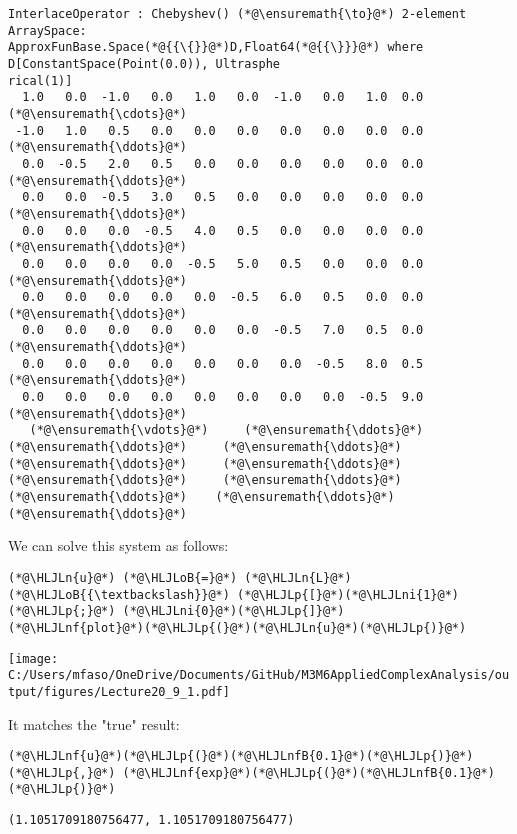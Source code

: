 \documentclass[12pt,landscape]{article}
\newcommand{\HLJLn}[1]{#1}
\newcommand{\HLJLnf}[1]{\textcolor[RGB]{66,102,213}{#1}}
\newcommand{\HLJLnfB}[1]{\textcolor[RGB]{59,151,46}{#1}}
\newcommand{\HLJLni}[1]{\textcolor[RGB]{59,151,46}{#1}}
\newcommand{\HLJLoB}[1]{\textcolor[RGB]{102,102,102}{\textbf{#1}}}
\newcommand{\HLJLp}[1]{#1}
\def\cent#1{\begin{center}#1\end{center} }
\begin{document}
{\begin{lstlisting}
InterlaceOperator : Chebyshev() (*@\ensuremath{\to}@*) 2-element ArraySpace:
ApproxFunBase.Space(*@{{\{}}@*)D,Float64(*@{{\}}}@*) where D[ConstantSpace(Point(0.0)), Ultrasphe
rical(1)]
  1.0   0.0  -1.0   0.0   1.0   0.0  -1.0   0.0   1.0  0.0  (*@\ensuremath{\cdots}@*)
 -1.0   1.0   0.5   0.0   0.0   0.0   0.0   0.0   0.0  0.0  (*@\ensuremath{\ddots}@*)
  0.0  -0.5   2.0   0.5   0.0   0.0   0.0   0.0   0.0  0.0  (*@\ensuremath{\ddots}@*)
  0.0   0.0  -0.5   3.0   0.5   0.0   0.0   0.0   0.0  0.0  (*@\ensuremath{\ddots}@*)
  0.0   0.0   0.0  -0.5   4.0   0.5   0.0   0.0   0.0  0.0  (*@\ensuremath{\ddots}@*)
  0.0   0.0   0.0   0.0  -0.5   5.0   0.5   0.0   0.0  0.0  (*@\ensuremath{\ddots}@*)
  0.0   0.0   0.0   0.0   0.0  -0.5   6.0   0.5   0.0  0.0  (*@\ensuremath{\ddots}@*)
  0.0   0.0   0.0   0.0   0.0   0.0  -0.5   7.0   0.5  0.0  (*@\ensuremath{\ddots}@*)
  0.0   0.0   0.0   0.0   0.0   0.0   0.0  -0.5   8.0  0.5  (*@\ensuremath{\ddots}@*)
  0.0   0.0   0.0   0.0   0.0   0.0   0.0   0.0  -0.5  9.0  (*@\ensuremath{\ddots}@*)
   (*@\ensuremath{\vdots}@*)     (*@\ensuremath{\ddots}@*)     (*@\ensuremath{\ddots}@*)     (*@\ensuremath{\ddots}@*)     (*@\ensuremath{\ddots}@*)     (*@\ensuremath{\ddots}@*)     (*@\ensuremath{\ddots}@*)     (*@\ensuremath{\ddots}@*)     (*@\ensuremath{\ddots}@*)    (*@\ensuremath{\ddots}@*)   (*@\ensuremath{\ddots}@*)
\end{lstlisting}



We can solve this system as follows:


\begin{lstlisting}
(*@\HLJLn{u}@*) (*@\HLJLoB{=}@*) (*@\HLJLn{L}@*) (*@\HLJLoB{{\textbackslash}}@*) (*@\HLJLp{[}@*)(*@\HLJLni{1}@*)(*@\HLJLp{;}@*) (*@\HLJLni{0}@*)(*@\HLJLp{]}@*)
(*@\HLJLnf{plot}@*)(*@\HLJLp{(}@*)(*@\HLJLn{u}@*)(*@\HLJLp{)}@*)
\end{lstlisting}

\cent{\texttt{[image: C:/Users/mfaso/OneDrive/Documents/GitHub/M3M6AppliedComplexAnalysis/output/figures/Lecture20\_9\_1.pdf]}}

It matches the "true" result:


\begin{lstlisting}
(*@\HLJLnf{u}@*)(*@\HLJLp{(}@*)(*@\HLJLnfB{0.1}@*)(*@\HLJLp{)}@*) (*@\HLJLp{,}@*) (*@\HLJLnf{exp}@*)(*@\HLJLp{(}@*)(*@\HLJLnfB{0.1}@*)(*@\HLJLp{)}@*)
\end{lstlisting}

\begin{lstlisting}
(1.1051709180756477, 1.1051709180756477)
\end{lstlisting}


}
\end{document}
